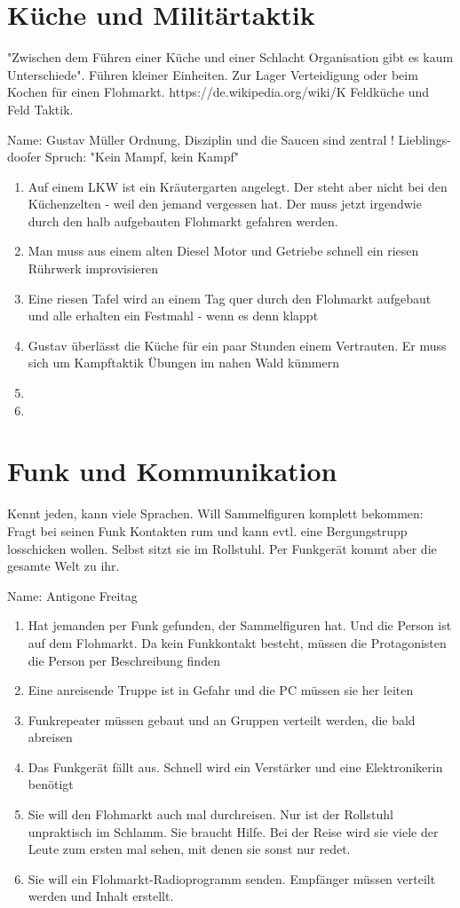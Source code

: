 \documentclass{book}
\begin{document}
\section{Küche und Militärtaktik}
"Zwischen dem Führen einer Küche und einer Schlacht Organisation gibt es kaum Unterschiede". Führen kleiner Einheiten. Zur Lager Verteidigung oder beim Kochen für einen Flohmarkt. https://de.wikipedia.org/wiki/K%
Feldküche und Feld Taktik.

Name: Gustav Müller
Ordnung, Disziplin und die Saucen sind zentral !
Lieblings-doofer Spruch: "Kein Mampf, kein Kampf"

\begin{enumerate}
\item Auf einem LKW ist ein Kräutergarten angelegt. Der steht aber nicht bei den Küchenzelten - weil den jemand vergessen hat. Der muss jetzt irgendwie durch den halb aufgebauten Flohmarkt gefahren werden.
\item Man muss aus einem alten Diesel Motor und Getriebe schnell ein riesen Rührwerk improvisieren
\item Eine riesen Tafel wird an einem Tag quer durch den Flohmarkt aufgebaut und alle erhalten ein Festmahl - wenn es denn klappt
\item Gustav überlässt die Küche für ein paar Stunden einem Vertrauten. Er muss sich um Kampftaktik Übungen im nahen Wald kümmern
\item
\item
\end{enumerate}

\section{Funk und Kommunikation}
Kennt jeden, kann viele Sprachen. Will Sammelfiguren komplett bekommen: Fragt bei seinen Funk Kontakten rum und kann evtl. eine Bergungstrupp losschicken wollen. Selbst sitzt sie im Rollstuhl. Per Funkgerät kommt aber die gesamte Welt zu ihr.

Name: Antigone Freitag

\begin{enumerate}
\item Hat jemanden per Funk gefunden, der Sammelfiguren hat. Und die Person ist auf dem Flohmarkt. Da kein Funkkontakt besteht, müssen die Protagonisten die Person per Beschreibung finden
\item Eine anreisende Truppe ist in Gefahr und die PC müssen sie her leiten
\item Funkrepeater müssen gebaut und an Gruppen verteilt werden, die bald abreisen
\item Das Funkgerät fällt aus. Schnell wird ein Verstärker und eine Elektronikerin benötigt
\item Sie will den Flohmarkt auch mal durchreisen. Nur ist der Rollstuhl unpraktisch im Schlamm. Sie braucht Hilfe. Bei der Reise wird sie viele der Leute zum ersten mal sehen, mit denen sie sonst nur redet.
\item Sie will ein Flohmarkt-Radioprogramm senden. Empfänger müssen verteilt werden und Inhalt erstellt.
\end{enumerate}
\end{document}
